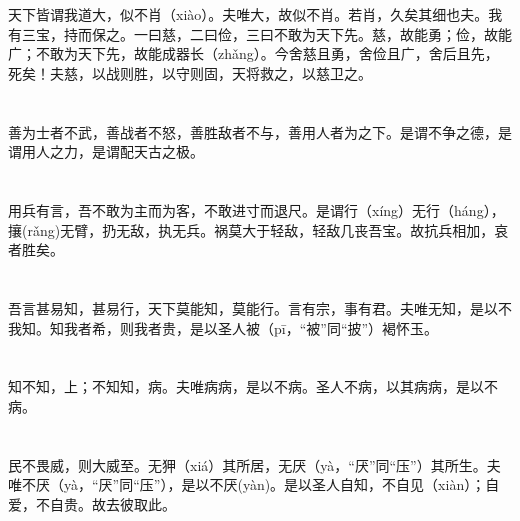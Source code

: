 \documentclass[a4paper,12pt,UTF8,twoside]{ctexbook}
\begin{document}
	\chapter{}	
	
	天下皆谓我道大，似不肖（xiào）。夫唯大，故似不肖。若肖，久矣其细也夫。我有三宝，持而保之。一曰慈，二曰俭，三曰不敢为天下先。慈，故能勇；俭，故能广；不敢为天下先，故能成器长（zhǎng）。今舍慈且勇，舍俭且广，舍后且先，死矣！夫慈，以战则胜，以守则固，天将救之，以慈卫之。
	
	\chapter{}	
	
	善为士者不武，善战者不怒，善胜敌者不与，善用人者为之下。是谓不争之德，是谓用人之力，是谓配天古之极。
	
	\chapter{}	
	
	用兵有言，吾不敢为主而为客，不敢进寸而退尺。是谓行（xíng）无行（háng），攘(rǎng)无臂，扔无敌，执无兵。祸莫大于轻敌，轻敌几丧吾宝。故抗兵相加，哀者胜矣。
	
	\chapter{}	
	
	吾言甚易知，甚易行，天下莫能知，莫能行。言有宗，事有君。夫唯无知，是以不我知。知我者希，则我者贵，是以圣人被（pī，“被”同“披”）褐怀玉。
	
	\chapter{}	
	
	知不知，上；不知知，病。夫唯病病，是以不病。圣人不病，以其病病，是以不病。
	
	\chapter{}	
	
	民不畏威，则大威至。无狎（xiá）其所居，无厌（yà，“厌”同“压”）其所生。夫唯不厌（yà，“厌”同“压”），是以不厌(yàn)。是以圣人自知，不自见（xiàn）；自爱，不自贵。故去彼取此。
	
	\chapter{}	
	
\end{document}
